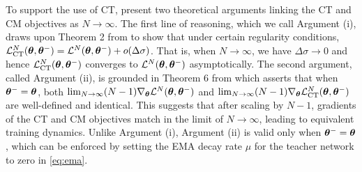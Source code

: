 To support the use of CT, \citet{song2023consistency} present two theoretical arguments linking the CT and CM objectives as $N \to \infty$. The first line of reasoning, which we call Argument (i), draws upon Theorem 2 from \citet{song2023consistency} to show that under certain regularity conditions, $\mathcal{L}_\text{CT}^N({\bm{\theta}}, {\bm{\theta}}^{-}) = \mathcal{L}^N({\bm{\theta}}, {\bm{\theta}}^-) + o(\Delta \sigma)$. That is, when $N \to \infty$, we have $\Delta \sigma \to 0$ and hence $\mathcal{L}_\text{CT}^N({\bm{\theta}}, {\bm{\theta}}^{-})$ converges to $\mathcal{L}^N({\bm{\theta}}, {\bm{\theta}}^-)$ asymptotically. The second argument, called Argument (ii), is grounded in Theorem 6 from \citet{song2023consistency} which asserts that when ${\bm{\theta}}^{-} = {\bm{\theta}}$, both $\lim_{N\to \infty}(N-1) \nabla_{\bm{\theta}} \mathcal{L}^N({\bm{\theta}}, {\bm{\theta}}^{-})$ and $\lim_{N\to \infty}(N-1) \nabla_{\bm{\theta}} \mathcal{L}^N_\text{CT}({\bm{\theta}}, {\bm{\theta}}^{-})$ are well-defined and identical. This suggests that after scaling by $N-1$, gradients of the CT and CM objectives match in the limit of $N \to \infty$, leading to equivalent training dynamics. Unlike Argument (i), Argument (ii) is valid only when ${\bm{\theta}}^{-} = {\bm{\theta}}$, which can be enforced by setting the EMA decay rate $\mu$ for the teacher network to zero in \cref{eq:ema}.


